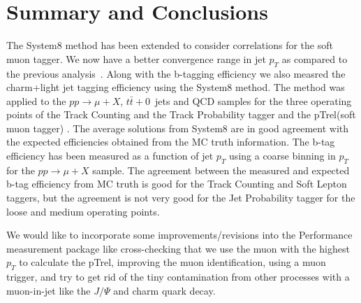 \section{Summary and Conclusions}


 The System8 method has been extended to consider correlations for the soft
muon tagger. We now have a better convergence range in jet $p_T$ as compared 
to the previous analysis~\cite{ref:btag_oldnote}. Along with
the b-tagging efficiency we also measred the charm+light jet tagging 
efficiency using the System8 method. The method was applied to the 
$pp\rightarrow \mu +X$, $t\bar{t}+0$~jets and QCD samples for the three 
operating points of the Track Counting and the Track Probability tagger and the
pTrel(soft muon tagger) . The average solutions from System8 are in good 
agreement with the expected efficiencies obtained from the MC truth information.
The b-tag efficiency has been measured as a function of jet $p_T$ using a coarse
binning in $p_T$ for the $pp\rightarrow \mu +X$ sample. The agreement between 
the measured and expected b-tag efficiency from MC truth is good for the Track 
Counting and Soft Lepton taggers, but the agreement is not very good for the 
Jet Probability tagger for the loose and medium operating points.

 We would like to incorporate some improvements/revisions into the Performance 
measurement package like cross-checking that we use the muon with the highest 
$p_T$ to calculate the pTrel, improving the muon identification, 
using a muon trigger, and try to get rid of the tiny contamination from other 
processes with a muon-in-jet like the $J/\Psi $ and charm quark decay.
